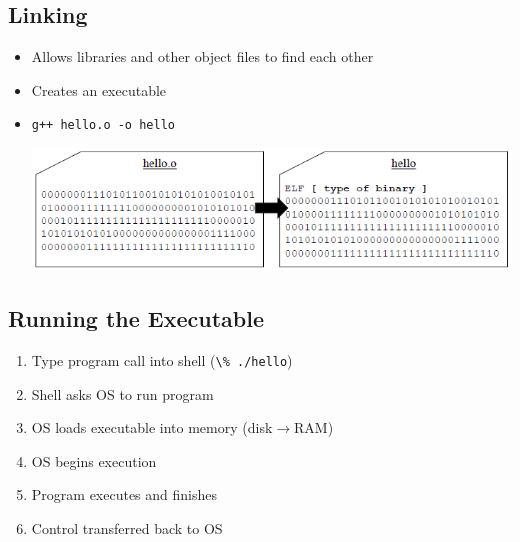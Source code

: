 \subsection{Linking}
\begin{itemize}
	\item Allows libraries and other object files to find each other
	\item Creates an executable
	\item \lstinline[style=bash]{g++ hello.o -o hello}
	\begin{center}
		\includegraphics[scale=0.6]{sections/lec1/link.png}
	\end{center}
\end{itemize}

\subsection{Running the Executable}
\begin{enumerate}
	\item Type program call into shell (\lstinline[style=bash]{\% ./hello})
	\item Shell asks OS to run program
	\item OS loads executable into memory (disk$\to$RAM)
	\item OS begins execution
	\item Program executes and finishes
	\item Control transferred back to OS
\end{enumerate}